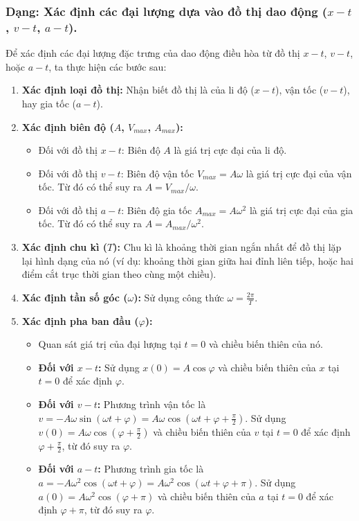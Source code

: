 \subsubsection{Dạng: Xác định các đại lượng dựa vào đồ thị dao động ($x-t$, $v-t$, $a-t$).}
\begin{phuongphap}
Để xác định các đại lượng đặc trưng của dao động điều hòa từ đồ thị $x-t$, $v-t$, hoặc $a-t$, ta thực hiện các bước sau:
\begin{enumerate}
    \item \textbf{Xác định loại đồ thị:} Nhận biết đồ thị là của li độ ($x-t$), vận tốc ($v-t$), hay gia tốc ($a-t$).
    \item \textbf{Xác định biên độ ($A$, $V_{max}$, $A_{max}$):}
    \begin{itemize}
        \item Đối với đồ thị $x-t$: Biên độ $A$ là giá trị cực đại của li độ.
        \item Đối với đồ thị $v-t$: Biên độ vận tốc $V_{max} = A\omega$ là giá trị cực đại của vận tốc. Từ đó có thể suy ra $A = V_{max}/\omega$.
        \item Đối với đồ thị $a-t$: Biên độ gia tốc $A_{max} = A\omega^2$ là giá trị cực đại của gia tốc. Từ đó có thể suy ra $A = A_{max}/\omega^2$.
    \end{itemize}
    \item \textbf{Xác định chu kì ($T$):} Chu kì là khoảng thời gian ngắn nhất để đồ thị lặp lại hình dạng của nó (ví dụ: khoảng thời gian giữa hai đỉnh liên tiếp, hoặc hai điểm cắt trục thời gian theo cùng một chiều).
    \item \textbf{Xác định tần số góc ($\omega$):} Sử dụng công thức $\omega = \frac{2\pi}{T}$.
    \item \textbf{Xác định pha ban đầu ($\varphi$):}
    \begin{itemize}
        \item Quan sát giá trị của đại lượng tại $t=0$ và chiều biến thiên của nó.
        \item \textbf{Đối với $x-t$:} Sử dụng $x(0) = A\cos\varphi$ và chiều biến thiên của $x$ tại $t=0$ để xác định $\varphi$.
        \item \textbf{Đối với $v-t$:} Phương trình vận tốc là $v = -A\omega\sin(\omega t + \varphi) = A\omega\cos(\omega t + \varphi + \frac{\pi}{2})$. Sử dụng $v(0) = A\omega\cos(\varphi + \frac{\pi}{2})$ và chiều biến thiên của $v$ tại $t=0$ để xác định $\varphi + \frac{\pi}{2}$, từ đó suy ra $\varphi$.
        \item \textbf{Đối với $a-t$:} Phương trình gia tốc là $a = -A\omega^2\cos(\omega t + \varphi) = A\omega^2\cos(\omega t + \varphi + \pi)$. Sử dụng $a(0) = A\omega^2\cos(\varphi + \pi)$ và chiều biến thiên của $a$ tại $t=0$ để xác định $\varphi + \pi$, từ đó suy ra $\varphi$.
    \end{itemize}
\end{enumerate}
\end{phuongphap}
